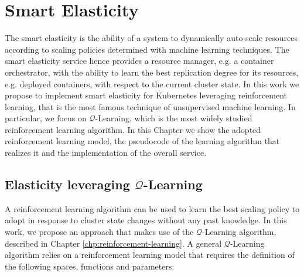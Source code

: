 \chapter{Smart Elasticity}
\label{chp:smart-elasticity}


The smart elasticity is the ability of a system to dynamically auto-scale resources according to scaling policies determined with machine learning techniques.
%
The smart elasticity service hence provides a resource manager, e.g. a container orchestrator, with the ability to learn the best replication degree for its resources, e.g. deployed containers, with respect to the current cluster state.
%
In this work we propose to implement smart elasticity for Kubernetes leveraging reinforcement learning, that is the most famous technique of unsupervised machine learning.
%
In particular, we focus on $\mathcal{Q}$-Learning, which is the most widely studied reinforcement learning algorithm.
%
In this Chapter we show the adopted reinforcement learning model, the pseudocode of the learning algorithm that realizes it and the implementation of the overall service.

%
%


\section{Elasticity leveraging $\mathcal{Q}$-Learning}
\label{sec:smart-elasticity-elasticity-leveraging-q-learning}

A reinforcement learning algorithm can be used to learn the best scaling policy to adopt in response to cluster state changes without any past knowledge.
%
In this work, we propose an approach that makes use of the $\mathcal{Q}$-Learning algorithm, described in Chapter \ref{chp:reinforcement-learning}.
%
A general $\mathcal{Q}$-Learning algorithm relies on a reinforcement learning model that requires the definition of the following spaces, functions and parameters:

